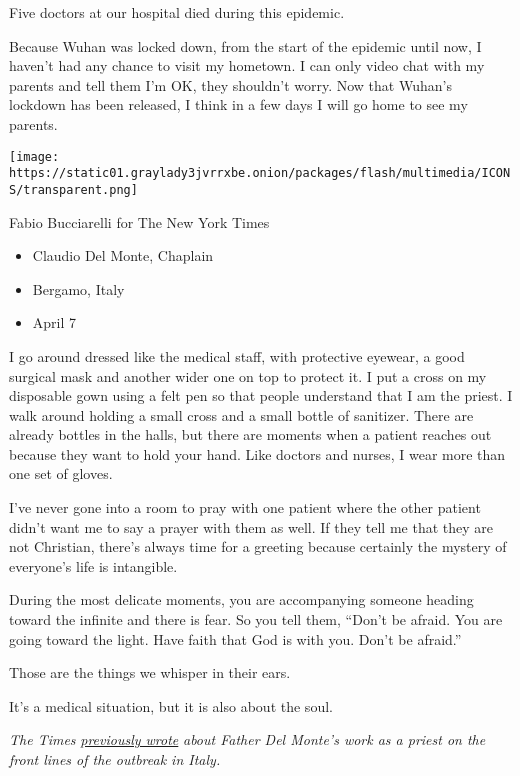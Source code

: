 Five doctors at our hospital died during this epidemic.

Because Wuhan was locked down, from the start of the epidemic until now,
I haven't had any chance to visit my hometown. I can only video chat
with my parents and tell them I'm OK, they shouldn't worry. Now that
Wuhan's lockdown has been released, I think in a few days I will go home
to see my parents.

\texttt{[image: https://static01.graylady3jvrrxbe.onion/packages/flash/multimedia/ICONS/transparent.png]}

Fabio Bucciarelli for The New York Times

\begin{itemize}
\tightlist
\item
  Claudio Del Monte, Chaplain
\item
  Bergamo, Italy
\item
  April 7
\end{itemize}

I go around dressed like the medical staff, with protective eyewear, a
good surgical mask and another wider one on top to protect it. I put a
cross on my disposable gown using a felt pen so that people understand
that I am the priest. I walk around holding a small cross and a small
bottle of sanitizer. There are already bottles in the halls, but there
are moments when a patient reaches out because they want to hold your
hand. Like doctors and nurses, I wear more than one set of gloves.

I've never gone into a room to pray with one patient where the other
patient didn't want me to say a prayer with them as well. If they tell
me that they are not Christian, there's always time for a greeting
because certainly the mystery of everyone's life is intangible.

During the most delicate moments, you are accompanying someone heading
toward the infinite and there is fear. So you tell them, ``Don't be
afraid. You are going toward the light. Have faith that God is with you.
Don't be afraid.''

Those are the things we whisper in their ears.

It's a medical situation, but it is also about the soul.

\emph{The Times}
\emph{\href{https://www.nytimes3xbfgragh.onion/2020/04/11/world/europe/italy-priests-coronavirus.html}{previously
wrote}} \emph{about Father Del Monte's work as a priest on the front
lines of the outbreak in Italy.}

